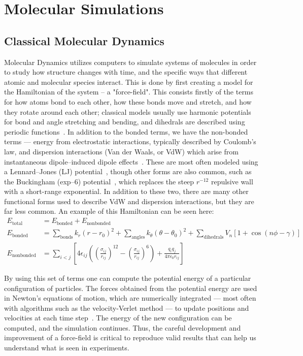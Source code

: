 \section{Molecular Simulations}
\subsection{Classical Molecular Dynamics}
Molecular Dynamics utilizes computers to simulate systems of molecules in order to study how structure changes
with time, and the specific ways that different atomic and molecular species interact. This is done
by first creating a model for the Hamiltonian of the system -- a "force-field". This consists firstly of the terms for how atoms
bond to each other, how these bonds move and stretch, and how they rotate around each other; classical models
usually use harmonic potentials for bond and angle stretching and bending, and dihedrals 
are described using periodic functions~\cite{gromacsmanual}.
In addition to the bonded terms, we have the non-bonded terms — energy from 
electrostatic interactions, typically described by Coulomb's law, and dispersion 
interactions (Van der Waals, or VdW) which arise from instantaneous dipole–induced dipole effects~\cite{gromacsmanual}. These are 
most often modeled using a Lennard–Jones (LJ) potential~\cite{Jones:1924,gromacsmanual}, though other forms are 
also common, such as the Buckingham (exp–6) potential~\cite{Buckingham:1938,gromacsmanual}, which replaces the steep 
\(r^{-12}\) repulsive wall with a short-range exponential. In addition to these two, there are many other
functional forms used to describe VdW and dispersion interactions, but they are far less common. An example of this Hamiltonian
can be seen here:
\begin{align}
E_{\mathrm{total}} &= E_{\mathrm{bonded}} + E_{\mathrm{nonbonded}} \\
E_{\mathrm{bonded}} &= \sum_{\text{bonds}} k_r (r - r_0)^2
+ \sum_{\text{angles}} k_\theta (\theta - \theta_0)^2
+ \sum_{\text{dihedrals}} V_n \left[ 1 + \cos\left( n\phi - \gamma \right) \right] \\
E_{\mathrm{nonbonded}} &= \sum_{i<j} \left[ 4\epsilon_{ij} \left( \left( \frac{\sigma_{ij}}{r_{ij}} \right)^{12}
- \left( \frac{\sigma_{ij}}{r_{ij}} \right)^{6} \right)
+ \frac{q_i q_j}{4\pi\epsilon_0 r_{ij}} \right]
\end{align}

By using this set of terms one can compute the potential energy of a particular configuration of particles. 
The forces obtained from the potential energy are used in Newton’s equations of motion, 
which are numerically integrated — most often with algorithms such as the velocity-Verlet method — 
to update positions and velocities at each time step~\cite{gromacsmanual}.
The energy of the new configuration
can be computed, and the simulation continues. Thus, the careful development and improvement of a force-field is critical to 
reproduce valid results that can help us understand what is seen in experiments.

